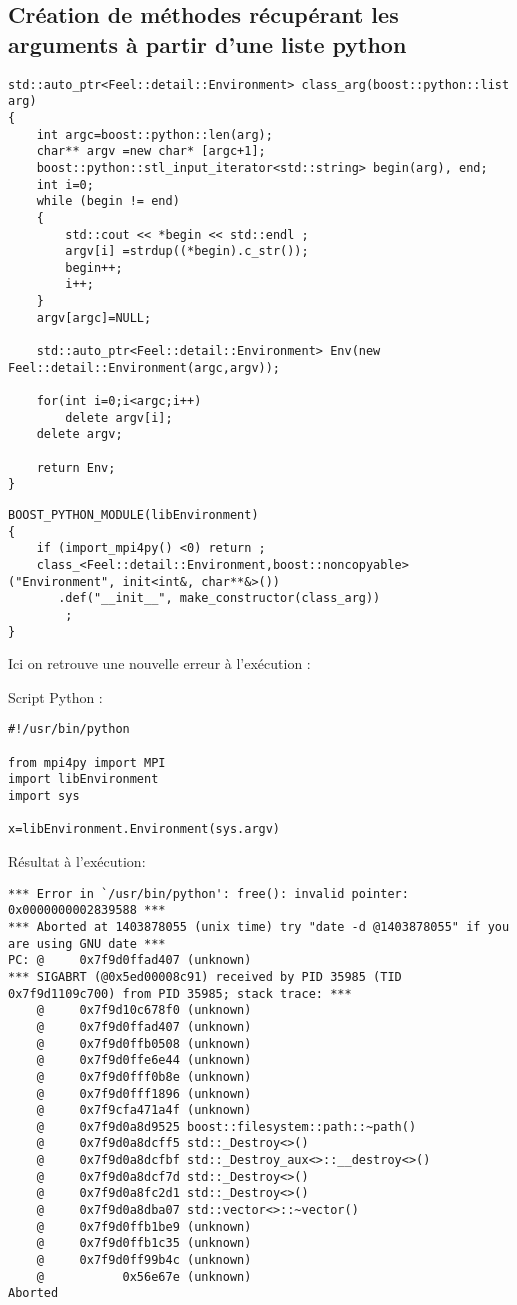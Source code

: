 \documentclass[12pt]{article}
\begin{document}
\subsection{Création de méthodes récupérant les arguments à partir d'une liste python}

\begin{lstlisting}
std::auto_ptr<Feel::detail::Environment> class_arg(boost::python::list arg)
{
    int argc=boost::python::len(arg);
    char** argv =new char* [argc+1];
    boost::python::stl_input_iterator<std::string> begin(arg), end;
    int i=0;
    while (begin != end)
    {
        std::cout << *begin << std::endl ;
        argv[i] =strdup((*begin).c_str());
        begin++;
        i++;
    }
    argv[argc]=NULL;

    std::auto_ptr<Feel::detail::Environment> Env(new Feel::detail::Environment(argc,argv));

    for(int i=0;i<argc;i++)
        delete argv[i];
    delete argv;    
    
    return Env;
}
\end{lstlisting}

\begin{lstlisting}
BOOST_PYTHON_MODULE(libEnvironment)
{
    if (import_mpi4py() <0) return ;
    class_<Feel::detail::Environment,boost::noncopyable> ("Environment", init<int&, char**&>())
       .def("__init__", make_constructor(class_arg)) 
        ;
}
\end{lstlisting}

Ici on retrouve une nouvelle erreur à l'exécution :
\newline

Script Python :
\begin{lstlisting}
#!/usr/bin/python

from mpi4py import MPI
import libEnvironment
import sys

x=libEnvironment.Environment(sys.argv)
\end{lstlisting}

Résultat à l'exécution:
\begin{lstlisting}
*** Error in `/usr/bin/python': free(): invalid pointer: 0x0000000002839588 ***
*** Aborted at 1403878055 (unix time) try "date -d @1403878055" if you are using GNU date ***
PC: @     0x7f9d0ffad407 (unknown)
*** SIGABRT (@0x5ed00008c91) received by PID 35985 (TID 0x7f9d1109c700) from PID 35985; stack trace: ***
    @     0x7f9d10c678f0 (unknown)
    @     0x7f9d0ffad407 (unknown)
    @     0x7f9d0ffb0508 (unknown)
    @     0x7f9d0ffe6e44 (unknown)
    @     0x7f9d0fff0b8e (unknown)
    @     0x7f9d0fff1896 (unknown)
    @     0x7f9cfa471a4f (unknown)
    @     0x7f9d0a8d9525 boost::filesystem::path::~path()
    @     0x7f9d0a8dcff5 std::_Destroy<>()
    @     0x7f9d0a8dcfbf std::_Destroy_aux<>::__destroy<>()
    @     0x7f9d0a8dcf7d std::_Destroy<>()
    @     0x7f9d0a8fc2d1 std::_Destroy<>()
    @     0x7f9d0a8dba07 std::vector<>::~vector()
    @     0x7f9d0ffb1be9 (unknown)
    @     0x7f9d0ffb1c35 (unknown)
    @     0x7f9d0ff99b4c (unknown)
    @           0x56e67e (unknown)
Aborted
\end{lstlisting}
\end{document}
